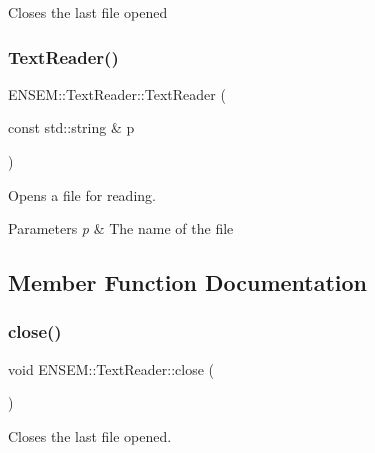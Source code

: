 Closes the last file opened \mbox{\label{classENSEM_1_1TextReader_a1c253bcaf58b6f01f25bb10b798f771e}} 
\subsubsection{\texorpdfstring{TextReader()}{TextReader()}\hspace{0.1cm}{\footnotesize\ttfamily [4/4]}}
{\footnotesize\ttfamily E\+N\+S\+E\+M\+::\+Text\+Reader\+::\+Text\+Reader (\begin{DoxyParamCaption}\item[{const std\+::string \&}]{p }\end{DoxyParamCaption})\hspace{0.3cm}{\ttfamily [explicit]}}

Opens a file for reading. 
\begin{DoxyParams}{Parameters}
{\em p} & The name of the file \\
\hline
\end{DoxyParams}


\subsection{Member Function Documentation}
\mbox{\label{classENSEM_1_1TextReader_a19f171518a1c7a06739d2d7de016f346}} 
\subsubsection{\texorpdfstring{close()}{close()}\hspace{0.1cm}{\footnotesize\ttfamily [1/2]}}
{\footnotesize\ttfamily void E\+N\+S\+E\+M\+::\+Text\+Reader\+::close (\begin{DoxyParamCaption}{ }\end{DoxyParamCaption})}



Closes the last file opened. 

